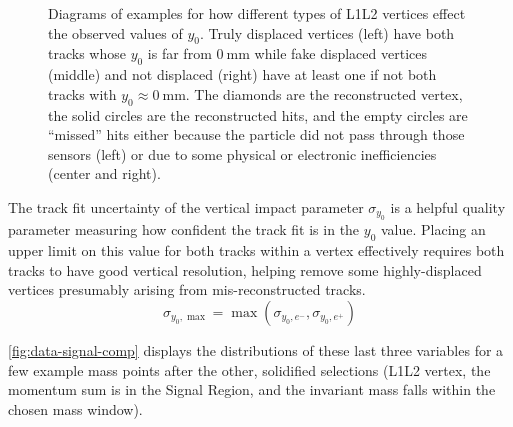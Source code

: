 \begin{figure}
  \begin{subfigure}{0.32\textwidth}
    \resizebox{\textwidth}{!}{}
  \end{subfigure}
  \begin{subfigure}{0.32\textwidth}
    \resizebox{\textwidth}{!}{}
  \end{subfigure}
  \begin{subfigure}{0.32\textwidth}
    \resizebox{\textwidth}{!}{}
  \end{subfigure}
  \caption{Diagrams of examples for how different types of L1L2 vertices effect the observed
  values of $y_0$.
  Truly displaced vertices (left) have both tracks whose $y_0$ is far
  from $\qty{0}{\mm}$ while fake displaced vertices (middle) and not displaced (right)
  have at least one if not both tracks with $y_0\approx\qty{0}{\mm}$.
  The diamonds are the reconstructed vertex, the solid circles are the reconstructed hits,
  and the empty circles are ``missed'' hits either because the particle did not pass
  through those sensors (left) or due to some physical or electronic inefficiencies (center and right).}
  \label{fig:hps-displace-eg}
\end{figure}

The track fit uncertainty of the vertical impact parameter $\sigma_{y_0}$
is a helpful quality parameter measuring how confident the track fit is
in the $y_0$ value.
Placing an upper limit on this value for both tracks within a vertex
effectively requires both tracks to have good vertical resolution,
helping remove some highly-displaced vertices presumably arising
from mis-reconstructed tracks.
\begin{equation}
  \sigma_{y_0,\max} = \max(\sigma_{y_0,e^-},\sigma_{y_0,e^+})
\end{equation}

\cref{fig:data-signal-comp} displays the distributions of these last three
variables for a few example mass points after the other, solidified selections
(L1L2 vertex, the momentum sum is in the Signal Region, and the invariant mass
falls within the chosen mass window).

